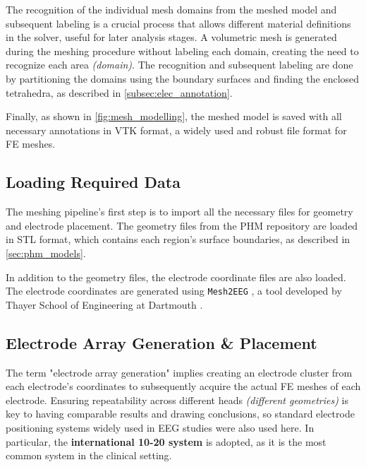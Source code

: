 \noindent The recognition of the individual mesh domains from the meshed model and subsequent labeling is a crucial process that allows different material definitions in the solver, useful for later analysis stages. A volumetric mesh is generated during the meshing procedure without labeling each domain, creating the need to recognize each area \textit{(domain)}. The recognition and subsequent labeling are done by partitioning the domains using the boundary surfaces and finding the enclosed tetrahedra, as described in \ref{subsec:elec_annotation}.

Finally, as shown in \autoref{fig:mesh_modelling}, the meshed model is saved with all necessary annotations in \gls{VTK} format, a widely used and robust file format for \gls{FE} meshes.

\subsection{Loading Required Data}

The meshing pipeline's first step is to import all the necessary files for geometry and electrode placement. The geometry files from the \gls{PHM} repository \cite{ErikG.Lee2016} are loaded in \gls{STL} format, which contains each region's surface boundaries, as described in \ref{sec:phm_models}.

In addition to the geometry files, the electrode coordinate files are also loaded. The electrode coordinates are generated using \texttt{Mesh2EEG} \cite{Giacometti2014}, a tool developed by Thayer School of Engineering at Dartmouth \cite{mesh2eeg_web}.

\subsection{Electrode Array Generation \& Placement}
\label{subsec:elec_placement}

The term "electrode array generation" implies creating an electrode cluster from each electrode's coordinates to subsequently acquire the actual \gls{FE} meshes of each electrode. Ensuring repeatability across different heads \textit{(different geometries)} is key to having comparable results and drawing conclusions, so standard electrode positioning systems widely used in \gls{EEG} studies were also used here. In particular, the \textbf{international 10-20 system} \cite[chapter 13]{Malmivuo1995} is adopted, as it is the most common system in the clinical setting.

